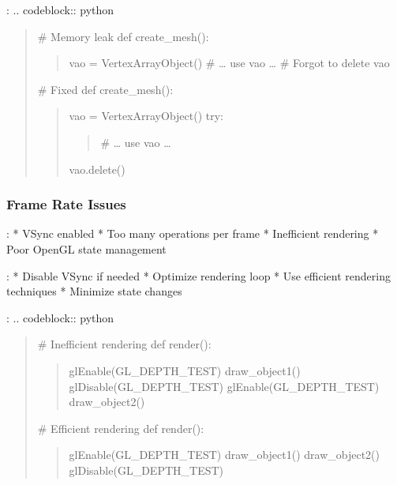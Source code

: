 \documentclass[a4paper,10pt,english,openany,oneside]{sphinxmanual}
\begin{document}
\sphinxAtStartPar
{}:
.. code\sphinxhyphen{}block:: python
\begin{quote}

\sphinxAtStartPar
\# Memory leak
def create\_mesh():
\begin{quote}

\sphinxAtStartPar
vao = VertexArrayObject()
\# … use vao …
\# Forgot to delete vao
\end{quote}

\sphinxAtStartPar
\# Fixed
def create\_mesh():
\begin{quote}

\sphinxAtStartPar
vao = VertexArrayObject()
try:
\begin{quote}

\sphinxAtStartPar
\# … use vao …
\end{quote}
\begin{description}
\sphinxAtStartPar
vao.delete()

\end{description}
\end{quote}
\end{quote}


\subsubsection{Frame Rate Issues}
\label{\detokenize{troubleshooting:frame-rate-issues}}
\sphinxAtStartPar
{}:
* VSync enabled
* Too many operations per frame
* Inefficient rendering
* Poor OpenGL state management

\sphinxAtStartPar
{}:
* Disable VSync if needed
* Optimize rendering loop
* Use efficient rendering techniques
* Minimize state changes

\sphinxAtStartPar
{}:
.. code\sphinxhyphen{}block:: python
\begin{quote}

\sphinxAtStartPar
\# Inefficient rendering
def render():
\begin{quote}

\sphinxAtStartPar
glEnable(GL\_DEPTH\_TEST)
draw\_object1()
glDisable(GL\_DEPTH\_TEST)
glEnable(GL\_DEPTH\_TEST)
draw\_object2()
\end{quote}

\sphinxAtStartPar
\# Efficient rendering
def render():
\begin{quote}

\sphinxAtStartPar
glEnable(GL\_DEPTH\_TEST)
draw\_object1()
draw\_object2()
glDisable(GL\_DEPTH\_TEST)
\end{quote}
\end{quote}
\end{document}
